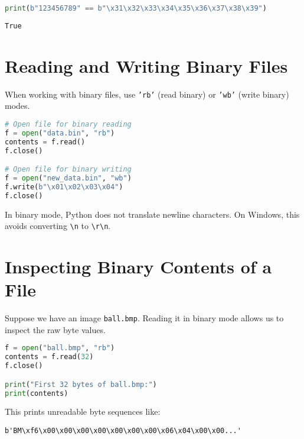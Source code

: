 \begin{lstlisting}[language=Python, caption={Byte string literals.}]
print(b"123456789" == b"\x31\x32\x33\x34\x35\x36\x37\x38\x39")
\end{lstlisting}

\begin{verbatim}
True
\end{verbatim}

\section*{Reading and Writing Binary Files}
When working with binary files, use \texttt{'rb'} (read binary) or \texttt{'wb'} (write binary) modes.

\begin{lstlisting}[language=Python, caption={Opening binary files.}]
# Open file for binary reading
f = open("data.bin", "rb")
contents = f.read()
f.close()

# Open file for binary writing
f = open("new_data.bin", "wb")
f.write(b"\x01\x02\x03\x04")
f.close()
\end{lstlisting}

In binary mode, Python does not translate newline characters. 
On Windows, this avoids converting \texttt{\textbackslash n} to \texttt{\textbackslash r\textbackslash n}.

\section*{Inspecting Binary Contents of a File}
Suppose we have an image \texttt{ball.bmp}. 
Reading it in binary mode allows us to inspect the raw byte values.

\begin{lstlisting}[language=Python, caption={Inspecting binary contents of an image.}]
f = open("ball.bmp", "rb")
contents = f.read(32)
f.close()

print("First 32 bytes of ball.bmp:")
print(contents)
\end{lstlisting}

This prints unreadable byte sequences like:
\begin{verbatim}
b'BM\xf6\x00\x00\x00\x00\x00\x00\x00\x06\x04\x00\x00...'
\end{verbatim}


